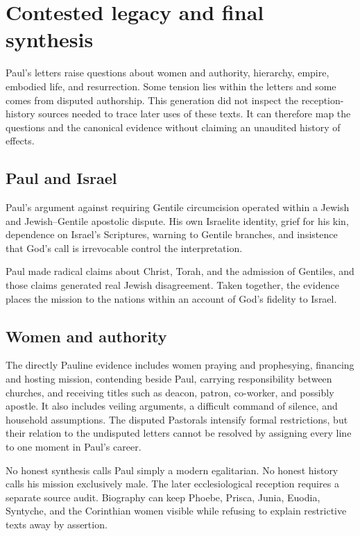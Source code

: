 \section{Contested legacy and final synthesis}\label{sec:paul-synthesis}

Paul's letters raise questions about women and authority, hierarchy, empire,
embodied life, and resurrection. Some tension lies within the letters and some
comes from disputed authorship. This generation did not inspect the
reception-history sources needed to trace later uses of these texts. It can
therefore map the questions and the canonical evidence without claiming an
unaudited history of effects.

\subsection{Paul and Israel}

Paul's argument against requiring Gentile circumcision operated within a
Jewish and Jewish--Gentile apostolic dispute. His own Israelite identity, grief
for his kin, dependence on Israel's Scriptures, warning to Gentile branches,
and insistence that God's call is irrevocable control the interpretation.

Paul made radical claims about Christ, Torah, and the admission of Gentiles,
and those claims generated real Jewish disagreement. Taken together, the
evidence places the mission to the nations within an account of God's fidelity
to Israel.

\subsection{Women and authority}

The directly Pauline evidence includes women praying and prophesying,
financing and hosting mission, contending beside Paul, carrying responsibility
between churches, and receiving titles such as deacon, patron, co-worker, and
possibly apostle. It also includes veiling arguments, a difficult command of
silence, and household assumptions. The disputed Pastorals intensify formal
restrictions, but their relation to the undisputed letters cannot be resolved
by assigning every line to one moment in Paul's career.

No honest synthesis calls Paul simply a modern egalitarian. No honest history
calls his mission exclusively male. The later ecclesiological reception
requires a separate source audit. Biography can keep Phoebe, Prisca,
Junia, Euodia, Syntyche, and the Corinthian women visible while refusing to
explain restrictive texts away by assertion.

